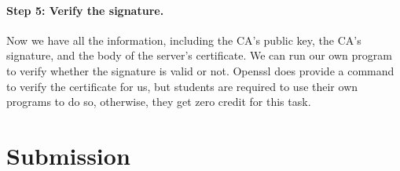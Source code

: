 \paragraph{Step 5: Verify the signature.}
Now we have all the information, including the CA's public key, the CA's signature, and the
body of the server's certificate. We can run our own program to verify whether the
signature is valid or not. Openssl does provide a command to verify the certificate for
us, but students are required to use their own programs to do so, otherwise, they get zero
credit for this task.


\section{Submission}

\seedsubmission



